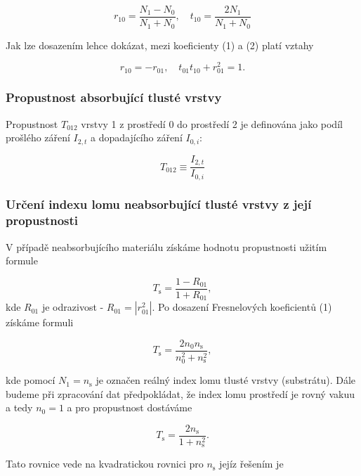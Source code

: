 \documentclass[czech,11pt,a4paper]{article}
\begin{document}
\begin{multicols}{2}
	\begin{equation}
		r_{10}=\frac{N_{1}-N_{0}}{N_{1}+N_{0}}, \quad t_{10}=\frac{2 N_{1}}{N_{1}+N_{0}} 
	\end{equation}

	
	Jak lze dosazením lehce dokázat, mezi koeficienty (1) a (2) platí vztahy
	
	\begin{equation}
		r_{10}=-r_{01}, \quad t_{01} t_{10}+r_{01}^{2}=1.
	\end{equation}
	\subsubsection{Propustnost absorbující tlusté vrstvy}
	Propustnost $T_{012}$ vrstvy 1 z prostředí 0 do prostředí 2 je definována jako podíl prošlého záření $I_{2,t}$ a dopadajícího záření $I_{0,i}$:
	
	\begin{equation}
		T_{012} \equiv \frac{I_{2, t}}{I_{0, i}} 
	\end{equation}
	\subsubsection{Určení indexu lomu neabsorbující tlusté vrstvy z její propustnosti}
	V případě neabsorbujícího materiálu získáme hodnotu propustnosti užitím formule
	
	\begin{equation}
		T_{\mathrm{s}}=\frac{1-R_{01}}{1+R_{01}},
	\end{equation}
	kde $R_{01}$ je odrazivost - $R_{01} = |r_{01}^2|$. Po dosazení Fresnelových koeficientů (1) získáme formuli
	
	\begin{equation}
		T_{\mathrm{s}}=\frac{2 n_{0} n_{\mathrm{s}}}{n_{0}^{2}+n_{\mathrm{s}}^{2}},
	\end{equation}
	
	kde pomocí $N_{1}=n_{\mathrm{s}}$ je označen reálný index lomu tlusté vrstvy (substrátu). Dále budeme při  zpracování dat předpokládat, že index lomu prostředí je rovný vakuu a tedy $n_{0}=1$ a pro propustnost dostáváme
	
	\begin{equation}
		T_{\mathrm{s}}=\frac{2 n_{\mathrm{s}}}{1+n_{\mathrm{s}}^{2}}.
	\end{equation}
	
	Tato rovnice vede na kvadratickou rovnici pro $n_{\mathrm{s}}$ jejíz řešením je
	

\end{multicols}
\end{document}

